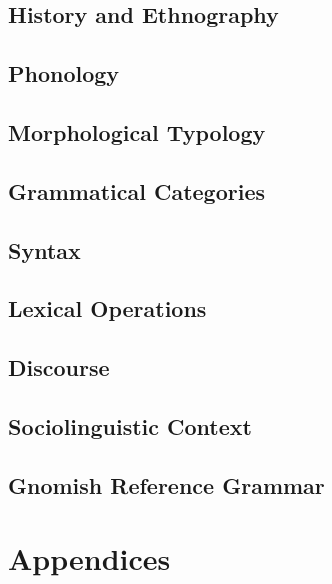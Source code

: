 \documentclass[12pt,letterpaper,openany,twoside]{memoir}
\let\originalpart=\part
\def\part{\cleardoublepage\originalpart}
\begin{document}
\chapter{History and Ethnography}

\chapter{Phonology}

\chapter{Morphological Typology}

\chapter{Grammatical Categories}

\chapter{Syntax}

\chapter{Lexical Operations}

\chapter{Discourse}

\chapter{Sociolinguistic Context}

\chapter{Gnomish Reference Grammar}


\appendix

\part{Appendices}




\backmatter


\printbibliography


\printindex
\end{document}
